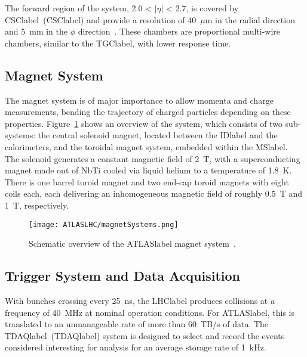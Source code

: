 The forward region of the system, 2.0 < $|\eta|$ < 2.7, is covered by \acrlong{CSClabel}~(\acrshort{CSClabel}) and provide a resolution of 40~$\mu$m in the radial direction and 5~mm in the $\phi$ direction~\cite{Collaboration_2008}. These chambers are proportional multi-wire chambers, similar to the \acrshort{TGClabel}, with lower response time.

\subsection{Magnet System}

The magnet system is of major importance to allow momenta and charge measurements, bending the trajectory of charged particles depending on these properties. Figure~\ref{figLHC:ATLASMagnets} shows an overview of the system, which consists of two sub-systems: the central solenoid magnet, located between the \acrshort{IDlabel} and the calorimeters, and the toroidal magnet system, embedded within the \acrshort{MSlabel}.\\

The solenoid generates a constant magnetic field of 2~T, with a superconducting magnet made out of NbTi cooled via liquid helium to a temperature of 1.8~K. There is one barrel toroid magnet and two end-cap toroid magnets with eight coils each, each delivering an inhomogeneous magnetic field of roughly 0.5~T and 1~T, respectively.

\begin{figure}[htbp]
    \RawFloats
    \begin{center}
    \texttt{[image: ATLASLHC/magnetSystems.png]}
    \caption{
        Schematic overview of the \acrshort{ATLASlabel} magnet system~\cite{JetGoodson}. 
    }
    \label{figLHC:ATLASMagnets}
    \end{center}
\end{figure}

\subsection{Trigger System and Data Acquisition}

With bunches crossing every 25~ns, the \acrshort{LHClabel} produces collisions at a frequency of 40~MHz at nominal operation conditions. For \acrshort{ATLASlabel}, this is translated to an unmanageable rate of more than 60~TB/s of data. The \acrlong{TDAQlabel}~(\acrshort{TDAQlabel}) system is designed to select and record the events considered interesting for analysis for an average storage rate of 1~kHz.\\

